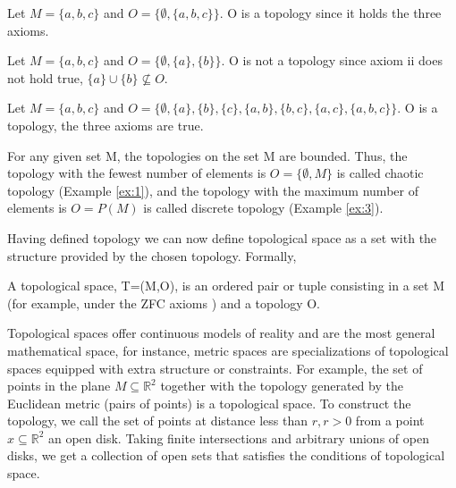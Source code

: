 \documentclass[onecollarge,runningheads]{svjour2}
\begin{document}
\begin{example}
Let $M = \{a,b,c\}$ and $O = \{\emptyset, \{a,b,c\}\}$. O is a topology since it holds the three axioms.
\label{ex:1}
\end{example}
\begin{example}
Let $M = \{a,b,c\}$ and $O = \{\emptyset, \{a\}, \{b\}\}$. O is not a topology since axiom ii does not hold true, $\{a\} \cup \{b\} \nsubseteq O$.
\label{ex:2}
\end{example}
\begin{example}
Let $M = \{a,b,c\}$ and $O = \{\emptyset, \{a\}, \{b\}, \{c\}, \{a,b\},\{b,c\},\{a,c\},\{a,b,c\}\}$. O is a topology, the three axioms are true.
\label{ex:3}
\end{example}
For any given set M, the topologies on the set M are bounded. Thus, the topology with the fewest number of elements is $O = \{\emptyset, M\}$ is called chaotic topology (Example \ref{ex:1}), and the topology with the maximum number of elements is $O = P(M)$ is called discrete topology (Example \ref{ex:3}). 

Having defined topology we can now define topological space as a set with the structure provided by the chosen topology. Formally,
\begin{definition}
A topological space, T=(M,O), is an ordered pair or tuple consisting in a set M (for example, under the ZFC axioms \cite{suppes1960axiomatic}) and a topology O. %
 \end{definition}

Topological spaces offer continuous models of reality and are the most general mathematical space, for instance, metric spaces are specializations of topological spaces equipped with extra structure or constraints. 
For example, the set of points in the plane $M \subseteq \mathbb{R}^2$ together with the topology generated by the Euclidean metric (pairs of points) is a topological space. To construct the topology, we call the set of points at distance less than $r, r > 0$ from a point $x \subseteq \mathbb{R}^2$ an open disk. Taking finite intersections and arbitrary unions of open disks, we get a collection of open sets that satisfies the conditions of topological space. 
 
\end{document}
